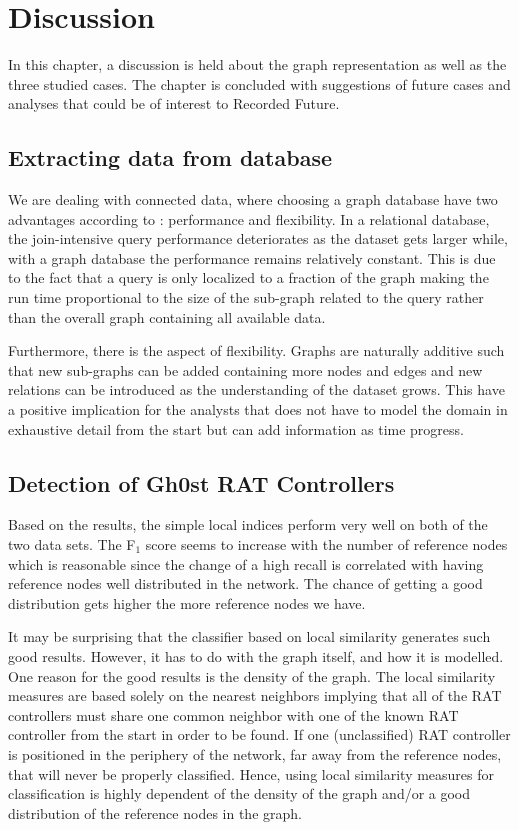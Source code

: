\chapter{Discussion}
In this chapter, a discussion is held about the graph representation as well as the three studied cases. The chapter is concluded with suggestions of future cases and analyses that could be of interest to Recorded Future.

\section{Extracting data from database}
We are dealing with connected data, where choosing a graph database have two advantages according to \citet{robinson2013}: performance and flexibility. In a relational database, the join-intensive query performance deteriorates as the dataset gets larger while, with a graph database the performance remains relatively constant. This is due to the fact that a query is only localized to a fraction of the graph making the run time proportional to the size of the sub-graph related to the query rather than the overall graph containing all available data.

Furthermore, there is the aspect of flexibility. Graphs are naturally additive \cite{robinson2013} such that new sub-graphs can be added containing more nodes and edges and new relations can be introduced as the understanding of the dataset grows. This have a positive implication for the analysts that does not have to model the domain in exhaustive detail from the start but can add information as time progress.

\section{Detection of Gh0st RAT Controllers}
Based on the results, the simple local indices perform very well on both of the two data sets. The F$_1$ score seems to increase with the number of reference nodes which is reasonable since the change of a high recall is correlated with having reference nodes well distributed in the network. The chance of getting a good distribution gets higher the more reference nodes we have. 

It may be surprising that the classifier based on local similarity generates such good results. However, it has to do with the graph itself, and how it is modelled. One reason for the good results is the density of the graph. The local similarity measures are based solely on the nearest neighbors implying that all of the RAT controllers must share one common neighbor with one of the known RAT controller from the start in order to be found. If one (unclassified) RAT controller is positioned in the periphery of the network, far away from the reference nodes, that will never be properly classified. Hence, using local similarity measures for classification is highly dependent of the density of the graph and/or a good distribution of the reference nodes in the graph. 

